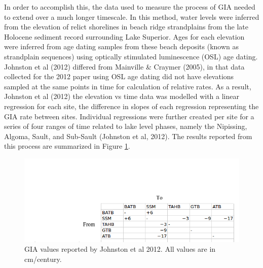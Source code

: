 In order to accomplish this, the data used to measure the process of
 GIA needed to extend over a much longer timescale. In this method, water
 levels were inferred from the elevation of relict shorelines in beach ridge
 strandplains from the late Holocene sediment record surrounding Lake Superior.
 Ages for each elevation were inferred from age dating samples from these beach
 deposits (known as strandplain sequences) using
 optically stimulated luminescence (OSL) age dating. Johnston et al (2012) differed from
 Mainville \& Craymer (2005), in that data collected for the 2012 paper using OSL
 age dating did not have
 elevations sampled at the same points in time for calculation of relative
 rates. As a result, Johnston et al (2012) the elevation vs time data was modelled with a linear
 regression for each site, the difference in slopes of each regression representing the GIA rate
 between sites. Individual regressions were further created per site
 for a series of four ranges of time related to lake level phases, namely the Nipissing,
 Algoma, Sault, and Sub-Sault (Johnston et al, 2012). The results reported from this process
 are summarized in Figure \ref{fig:jj2012Grid}. \\
 
 \begin{figure}[t]
	\includegraphics[width=0.9\linewidth]{jjGrid.png}
	\caption{GIA values reported by Johnston et al 2012. All values are in cm/century.}
	\label{fig:jj2012Grid}
 \end{figure}
 
